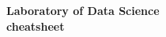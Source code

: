\documentclass[11pt]{article}
\begin{document}
\begin{titlepage}
        \noindent\Huge{\textbf{Laboratory of Data Science}}\\
        \textbf{cheatsheet}
\end{titlepage}



\end{document}
